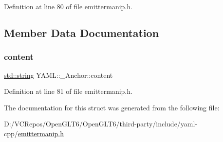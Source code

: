 Definition at line 80 of file emittermanip.\+h.



\subsection{Member Data Documentation}
\mbox{\label{struct_y_a_m_l_1_1___anchor_ad6ceeb24927d1ab467ef97378ca0e251}} 
\subsubsection{\texorpdfstring{content}{content}}
{\footnotesize\ttfamily \mbox{\hyperlink{glad_8h_ac83513893df92266f79a515488701770}{std\+::string}} Y\+A\+M\+L\+::\+\_\+\+Anchor\+::content}



Definition at line 81 of file emittermanip.\+h.



The documentation for this struct was generated from the following file\+:\begin{DoxyCompactItemize}
\item 
D\+:/\+V\+C\+Repos/\+Open\+G\+L\+T6/\+Open\+G\+L\+T6/third-\/party/include/yaml-\/cpp/\mbox{\hyperlink{emittermanip_8h}{emittermanip.\+h}}\end{DoxyCompactItemize}
